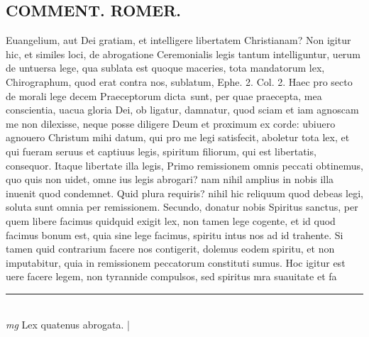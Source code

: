 \documentclass{article}
\begin{document}
\begin{pages}
\section*{COMMENT. ROMER.  }\pstart Euangelium, aut Dei gratiam, et intelligere libertatem Christianam? Non igitur hic, et similes loci, de abrogatione Ceremonialis legis tantum intelliguntur, uerum de untuersa lege, qua sublata est quoque maceries, tota mandatorum lex, Chirographum, quod erat contra nos, sublatum, Ephe. 2. Col. 2. Haec pro secto de morali lege decem Praeceptorum dicta sunt, per quae praecepta, mea conscientia, uacua gloria Dei, ob ligatur, damnatur, quod sciam et iam agnoscam me non dilexisse, neque posse diligere Deum et proximum ex corde: ubiuero agnouero Christum mihi datum, qui pro me legi satisfecit, aboletur tota lex, et qui fueram seruus et captiuus legis, spiritum filiorum, qui est libertatis, consequor. Itaque libertate illa legis, Primo remissionem omnis peccati obtinemus, quo quis non uidet, omne ius legis abrogari? nam nihil amplius in nobis illa inuenit quod condemnet. Quid plura requiris? nihil hic reliquum quod debeas legi, soluta sunt omnia per remissionem. Secundo, donatur nobis Spiritus sanctus, per quem libere facimus quidquid exigit lex, non tamen lege cogente, et id quod facimus bonum est, quia sine lege facimus, spiritu intus nos ad id trahente. Si tamen quid contrarium facere nos contigerit, dolemus eodem spiritu, et non imputabitur, quia in remissionem peccatorum constituti sumus. Hoc igitur est uere facere legem, non tyrannide compulsos, sed spiritus mra suauitate et fa\pend
\vspace{0.5cm}\noindent
\vspace{0.2cm}\rule{1cm}{0.2pt}\\ 
\hspace{0.2cm}\textit{mg}
\footnotesize Lex quatenus abrogata.  
\normalsize| 

\end{pages}
\end{document}
